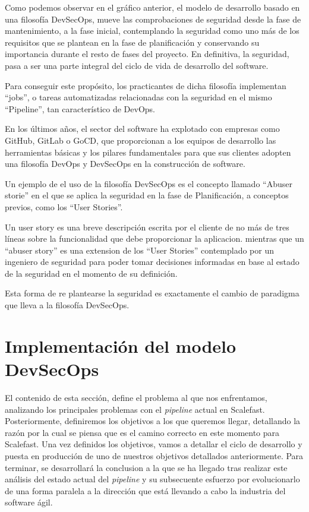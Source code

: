\documentclass[12pt]{report} %
\begin{document}
Como podemos observar en el gráfico anterior, el modelo de desarrollo basado en
una filosofía DevSecOps, mueve las comprobaciones de seguridad desde la fase de
mantenimiento, a la fase inicial, contemplando la seguridad como uno más de los
requisitos que se plantean en la fase de planificación y conservando su
importancia durante el resto de fases del proyecto.  En definitiva, la
seguridad, pasa a ser una parte integral del ciclo de vida de desarrollo del
software. 

Para conseguir este propósito, los practicantes de dicha filosofía implementan
``jobs'', o tareas automatizadas relacionadas con la seguridad en el mismo
``Pipeline'', tan característico de DevOps.

En los últimos años, el sector del software ha explotado con empresas como
GitHub, GitLab o GoCD, que proporcionan a los equipos de desarrollo las
herramientas básicas y los pilares fundamentales para que sus clientes adopten
una filosofía DevOps y DevSecOps en la construcción de
software.\cite{Google2019}

Un ejemplo de el uso de la filosofía DevSecOps es el concepto llamado ``Abuser
storie'' \cite{Bor2006} en el que se aplica la seguridad en la fase de
Planificación, a conceptos previos, como los ``User Stories''.

Un user story es una breve descripción escrita por el cliente de no más de tres
líneas sobre la funcionalidad que debe proporcionar la aplicacion.
\cite{XPUserStory} mientras que un ``abuser story'' es una extension de los
``User Stories'' contemplado por un ingeniero de seguridad para poder tomar
decisiones informadas en base al estado de la seguridad en el momento de su
definición. \cite{Bor2006}

Esta forma de re plantearse la seguridad es exactamente el cambio de paradigma
que lleva a la filosofía DevSecOps.


\chapter{Implementación del modelo DevSecOps}

El contenido de esta sección, define el problema al que nos enfrentamos,
analizando los principales problemas con el \textit{\gls{pipeline}} actual en
Scalefast.  Posteriormente, definiremos los objetivos a los que queremos llegar,
detallando la razón por la cual se piensa que es el camino correcto en este
momento para Scalefast.
Una vez definidos los objetivos, vamos a detallar el ciclo de desarrollo y
puesta en producción de uno de nuestros objetivos detallados anteriormente.
Para terminar, se desarrollará la conclusion a la que se ha llegado tras
realizar este análisis del estado actual del \textit{\gls{pipeline}} y su
subsecuente esfuerzo por evolucionarlo de una forma paralela a la dirección que
está llevando a cabo la industria del software ágil.
\end{document}
